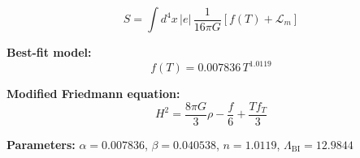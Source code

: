 
\begin{equation}
  S = \int d^4x \, |e| \, \frac{1}{16\pi G} \left[ f(T) + \mathcal{L}_m \right]
\end{equation}

\textbf{Best-fit model:}
\begin{equation}
  f(T) = 0.007836 \, T^{1.0119}
\end{equation}

\textbf{Modified Friedmann equation:}
\begin{equation}
  H^2 = \frac{8\pi G}{3} \rho - \frac{f}{6} + \frac{T f_T}{3}
\end{equation}

\textbf{Parameters:}
$\alpha = 0.007836$, \quad
$\beta = 0.040538$, \quad
$n = 1.0119$, \quad
$\Lambda_{\text{BI}} = 12.9844$